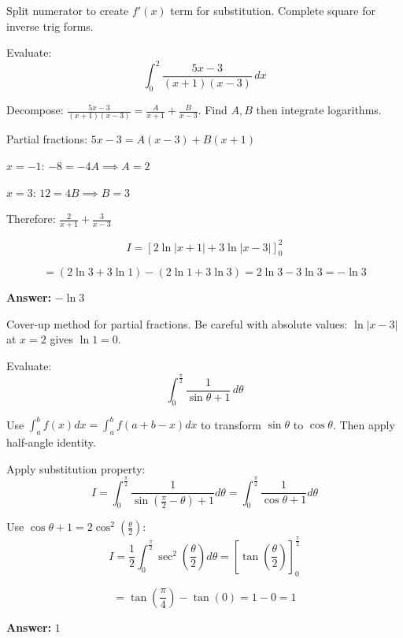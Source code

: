 \begin{takeaways}
Split numerator to create $f'(x)$ term for substitution. Complete square for inverse trig forms.
\end{takeaways}

\vspace{1cm}

\begin{problem}
Evaluate:
\[
\int_{0}^{2} \frac{5x - 3}{(x + 1)(x - 3)} \, dx
\]
\end{problem}

\begin{hint}
Decompose: $\frac{5x-3}{(x+1)(x-3)} = \frac{A}{x+1} + \frac{B}{x-3}$. Find $A, B$ then integrate logarithms.
\end{hint}

\begin{solution}
Partial fractions: $5x-3 = A(x-3) + B(x+1)$

$x=-1$: $-8 = -4A \implies A = 2$

$x=3$: $12 = 4B \implies B = 3$

Therefore: $\frac{2}{x+1} + \frac{3}{x-3}$

\[
I = [2\ln|x+1| + 3\ln|x-3|]_0^2
\]

\[
= (2\ln 3 + 3\ln 1) - (2\ln 1 + 3\ln 3) = 2\ln 3 - 3\ln 3 = -\ln 3
\]

\textbf{Answer:} $\boxed{-\ln 3}$
\end{solution}

\begin{takeaways}
Cover-up method for partial fractions. Be careful with absolute values: $\ln|x-3|$ at $x=2$ gives $\ln 1 = 0$.
\end{takeaways}

\vspace{1cm}

\begin{problem}
Evaluate:
\[
\int_{0}^{\frac{\pi}{2}} \frac{1}{\sin \theta + 1} \, d\theta
\]
\end{problem}

\begin{hint}
Use $\int_a^b f(x)dx = \int_a^b f(a+b-x)dx$ to transform $\sin\theta$ to $\cos\theta$. Then apply half-angle identity.
\end{hint}

\begin{solution}
Apply substitution property:
\[
I = \int_{0}^{\frac{\pi}{2}} \frac{1}{\sin(\frac{\pi}{2}-\theta) + 1} d\theta = \int_{0}^{\frac{\pi}{2}} \frac{1}{\cos\theta + 1} d\theta
\]

Use $\cos\theta + 1 = 2\cos^2(\frac{\theta}{2})$:
\[
I = \frac{1}{2}\int_0^{\frac{\pi}{2}} \sec^2\left(\frac{\theta}{2}\right) d\theta = \left[\tan\left(\frac{\theta}{2}\right)\right]_0^{\frac{\pi}{2}}
\]

\[
= \tan\left(\frac{\pi}{4}\right) - \tan(0) = 1 - 0 = 1
\]

\textbf{Answer:} $\boxed{1}$
\end{solution}


